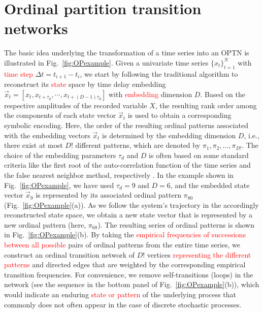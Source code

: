 \documentclass[12pt,aip,cha,reprint,nofootinbib]{revtex4-1}
\begin{document}
\section{Ordinal partition transition networks} \label{sec:intro}
The basic idea underlying the transformation of a time series into an OPTN is illustrated in Fig.~\ref{fig:OPexample}. Given a univariate time series $\{x_t\}_{t=1}^N$ with \textcolor{red}{time step} $\Delta t = t_{i+1} - t_{i}$, we start by following the traditional algorithm to reconstruct its \textcolor{red}{state} space by time delay embedding \cite{Takens1981,Kantz97} $\vec{x}_{t} = [x_{t}, x_{t+\tau_d}, \cdots, x_{t+(D-1)\tau_d}]$ with \textcolor{red}{embedding} dimension $D$. Based on the respective amplitudes of the recorded variable $X$, the resulting rank order among the components of each state vector $\vec{x}_t$ is used to obtain a corresponding symbolic encoding. Here, the order of the resulting ordinal patterns associated with the embedding vectors $\vec{x}_{t}$ is determined by the embedding dimension $D$, i.e., there exist at most $D!$ different patterns, which are denoted by $\pi_1, \pi_2, \dots, \pi_{D!}$. The choice of the embedding parameters $\tau_d$ and $D$ is often based on some standard criteria like the first root of the auto-correlation function of the time series and the false nearest neighbor method, respectively \cite{Kantz97}. In the example shown in Fig.~\ref{fig:OPexample}, we have used $\tau_d = 9$ and $D = 6$, and the embedded state vector $\vec{x}_{9}$ is represented by its associated ordinal pattern $\pi_{80}$ (Fig.~\ref{fig:OPexample}(a)). As we follow the system's trajectory in the accordingly reconstructed state space, we obtain a new state vector that is represented by a new ordinal pattern (here, $\pi_{68}$). The resulting series of ordinal patterns is shown in Fig.~\ref{fig:OPexample}(b). By taking the \textcolor{red}{empirical frequencies of successions between all possible} pairs of ordinal patterns from the entire time series, we construct an ordinal transition network of $D!$ vertices \textcolor{red}{representing the different patterns} and directed edges that are weighted by the corresponding empirical transition frequencies. For convenience, we remove self-transitions (loops) in the network (see the sequence in the bottom panel of Fig.~\ref{fig:OPexample}(b)), which would indicate an enduring \textcolor{red}{state or pattern} of the underlying process that commonly does not often appear in the case of discrete stochastic processes. 
\end{document}
